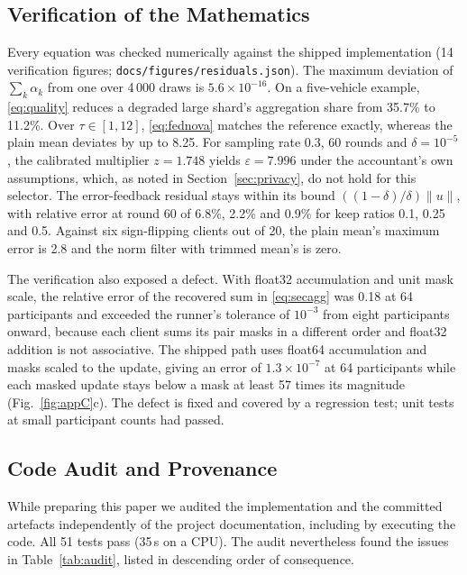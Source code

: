 \documentclass[journal]{IEEEtran}
\newcommand{\code}[1]{\texttt{#1}}
\begin{document}
\subsection{Verification of the Mathematics}\label{sec:verify}
Every equation was checked numerically against the shipped implementation (14 verification figures; \code{docs/figures/residuals.json}). The maximum deviation of $\sum_k\alpha_k$ from one over 4\,000 draws is $5.6\times10^{-16}$. On a five-vehicle example, \eqref{eq:quality} reduces a degraded large shard's aggregation share from 35.7\% to 11.2\%. Over $\tau\in[1,12]$, \eqref{eq:fednova} matches the reference exactly, whereas the plain mean deviates by up to 8.25. For sampling rate 0.3, 60 rounds and $\delta=10^{-5}$, the calibrated multiplier $z=1.748$ yields $\varepsilon=7.996$ under the accountant's own assumptions, which, as noted in Section~\ref{sec:privacy}, do not hold for this selector. The error-feedback residual stays within its bound $((1-\delta)/\delta)\lVert u\rVert$, with relative error at round 60 of 6.8\%, 2.2\% and 0.9\% for keep ratios 0.1, 0.25 and 0.5. Against six sign-flipping clients out of 20, the plain mean's maximum error is 2.8 and the norm filter with trimmed mean's is zero.

The verification also exposed a defect. With float32 accumulation and unit mask scale, the relative error of the recovered sum in \eqref{eq:secagg} was 0.18 at 64 participants and exceeded the runner's tolerance of $10^{-3}$ from eight participants onward, because each client sums its pair masks in a different order and float32 addition is not associative. The shipped path uses float64 accumulation and masks scaled to the update, giving an error of $1.3\times10^{-7}$ at 64 participants while each masked update stays below a mask at least 57 times its magnitude (Fig.~\ref{fig:appC}c). The defect is fixed and covered by a regression test; unit tests at small participant counts had passed.

\subsection{Code Audit and Provenance}\label{sec:audit}
While preparing this paper we audited the implementation and the committed artefacts independently of the project documentation, including by executing the code. All 51 tests pass (35\,s on a CPU). The audit nevertheless found the issues in Table~\ref{tab:audit}, listed in descending order of consequence.
\end{document}
